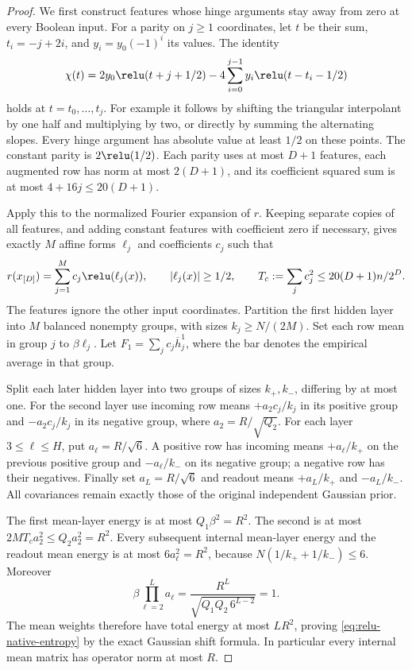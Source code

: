 \begin{proof}
We first construct features whose hinge arguments stay away from zero
at every Boolean input.  For a parity on $j\geq1$ coordinates, let
$t$ be their sum, $t_i=-j+2i$, and $y_i=y_0(-1)^i$ its values.
The identity
\begin{equation}
 \chi(t)=2y_0\relu(t+j+1/2)
             -4\sum_{i=0}^{j-1}y_i\relu(t-t_i-1/2)
 \label{eq:relu-margin-parity}
\end{equation}
holds at $t=t_0,\ldots,t_j$.
For example it follows by shifting the triangular interpolant by
one half and multiplying by two, or directly by summing the alternating
slopes.  Every hinge argument has absolute value at least $1/2$ on
these points.  The constant parity is $2\relu(1/2)$.
Each parity uses at most $D+1$ features, each augmented row has norm
at most $2(D+1)$, and its coefficient squared sum is at most
$4+16j\leq20(D+1)$.

Apply this to the normalized Fourier expansion of $r$.  Keeping
separate copies of all features, and adding constant features with
coefficient zero if necessary, gives exactly $M$ affine forms $\ell_j$
and coefficients $c_j$ such that
\[
 r(x_{[D]})=\sum_{j=1}^M c_j\relu(\ell_j(x)),\qquad
 |\ell_j(x)|\geq1/2,\qquad
 T_c:=\sum_jc_j^2\leq20(D+1)n/2^D.
\]
The features ignore the other input coordinates.
Partition the first hidden layer into $M$ balanced nonempty groups,
with sizes $k_j\geq N/(2M)$.  Set each row mean in group $j$ to
$\beta\ell_j$.  Let $F_1=\sum_jc_j\overline h^1_j$, where the bar
denotes the empirical average in that group.

Split each later hidden layer into two groups of sizes $k_+,k_-$,
differing by at most one.  For the second layer use incoming row
means $+a_2c_j/k_j$ in its positive group and $-a_2c_j/k_j$ in its
negative group, where $a_2=R/\sqrt{Q_2}$.
For each layer $3\leq\ell\leq H$, put
$a_\ell=R/\sqrt6$.  A positive row has incoming means
$+a_\ell/k_+$ on the previous positive group and
$-a_\ell/k_-$ on its negative group; a negative row has their negatives.
Finally set $a_L=R/\sqrt6$ and readout means
$+a_L/k_+$ and $-a_L/k_-$.
All covariances remain exactly those of the original independent
Gaussian prior.

The first mean-layer energy is at most $Q_1\beta^2=R^2$.
The second is at most
$2MT_ca_2^2\leq Q_2a_2^2=R^2$.
Every subsequent internal mean-layer energy and the readout mean
energy is at most $6a_\ell^2=R^2$, because
$N(1/k_++1/k_-)\leq6$.
Moreover
\[
 \beta\prod_{\ell=2}^La_\ell
 =\frac{R^L}{\sqrt{Q_1Q_2\,6^{L-2}}}=1.
\]
The mean weights therefore have total energy at most $LR^2$, proving
\eqref{eq:relu-native-entropy} by the exact Gaussian shift formula.
In particular every internal mean matrix has operator norm at most $R$.


\end{proof}
